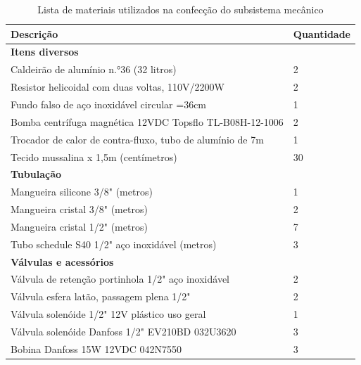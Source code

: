 \begin{center}
	\begin{table}[H]
		\captionsetup{justification=centering}
		\caption[Lista de materiais utilizados na confecção do subsistema mecânico]{Lista de materiais utilizados na confecção do subsistema mecânico}
		\label{bom_mec}
		\begin{tabular}{ | M{13cm} | M{2cm} |}
			\hline
			\textbf{Descrição} & \textbf{Quantidade} \\ \hline
			
			\textbf{Itens diversos} & \\ \hline
			Caldeirão de alumínio n.\si{\degree}36 (32 litros) & 2\\ \hline
			Resistor helicoidal com duas voltas, 110V/2200W & 2\\ \hline
			Fundo falso de aço inoxidável circular \si{\phi}=36cm & 1\\ \hline
			Bomba centrífuga magnética 12VDC Topsflo TL-B08H-12-1006 & 2\\ \hline
			Trocador de calor de contra-fluxo, tubo de alumínio de 7m & 1\\ \hline
			Tecido mussalina x 1,5m (centímetros) & 30\\ \hline
			
			\textbf{Tubulação} & \\ \hline
			Mangueira silicone 3/8" (metros) & 1\\ \hline
			Mangueira cristal 3/8" (metros) & 2\\ \hline
			Mangueira cristal 1/2" (metros) & 7\\ \hline
			Tubo schedule S40 1/2" aço inoxidável (metros) & 3\\ \hline
			
			\textbf{Válvulas e acessórios} & \\ \hline
			Válvula de retenção portinhola 1/2" aço inoxidável & 2\\ \hline
			Válvula esfera latão, passagem plena 1/2" & 2\\ \hline
			Válvula solenóide 1/2" 12V plástico uso geral & 1\\ \hline
			Válvula solenóide Danfoss 1/2" EV210BD 032U3620 & 3\\ \hline
			Bobina Danfoss 15W 12VDC 042N7550 & 3\\ \hline
			

\end{tabular}
\end{table}
\end{center}
